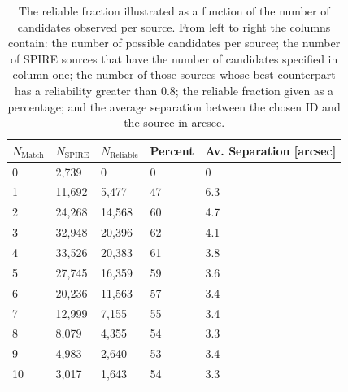 \begin{table}
    \centering
    \begin{tabular}{|p{2.5cm}|p{2.5cm}|p{2.5cm}|p{2.5cm}|p{4cm}|}
        \hline
        $N_{\textrm{Match}}$ & $N_{\textrm{SPIRE}}$ & $N_{\textrm{Reliable}}$ & Percent & Av. Separation [arcsec] \\
        \hline
        \hline
        0 & 2,739 & 0 & 0 & 0 \\
        1 & 11,692 & 5,477 & 47 & 6.3 \\
        2 & 24,268 & 14,568 & 60 & 4.7 \\
        3 & 32,948 & 20,396 & 62 & 4.1 \\
        4 & 33,526 & 20,383 & 61 & 3.8 \\
        5 & 27,745 & 16,359 & 59 & 3.6 \\
        6 & 20,236 & 11,563 & 57 & 3.4 \\
        7 & 12,999 & 7,155 & 55 & 3.4 \\
        8 & 8,079 & 4,355 & 54 & 3.3 \\
        9 & 4,983 & 2,640 & 53 & 3.4 \\
        10 & 3,017 & 1,643 & 54 & 3.3 \\
        \hline
    \end{tabular}
    \caption{The reliable fraction illustrated as a function of the number of candidates observed per source. From left to right the columns contain: the number of possible candidates per source; the number of SPIRE sources that have the number of candidates specified in column one; the number of those sources whose best counterpart has a reliability greater than 0.8; the reliable fraction given as a percentage; and the average separation between the chosen ID and the source in arcsec.}
    \label{tab:multiplicity}
\end{table}

